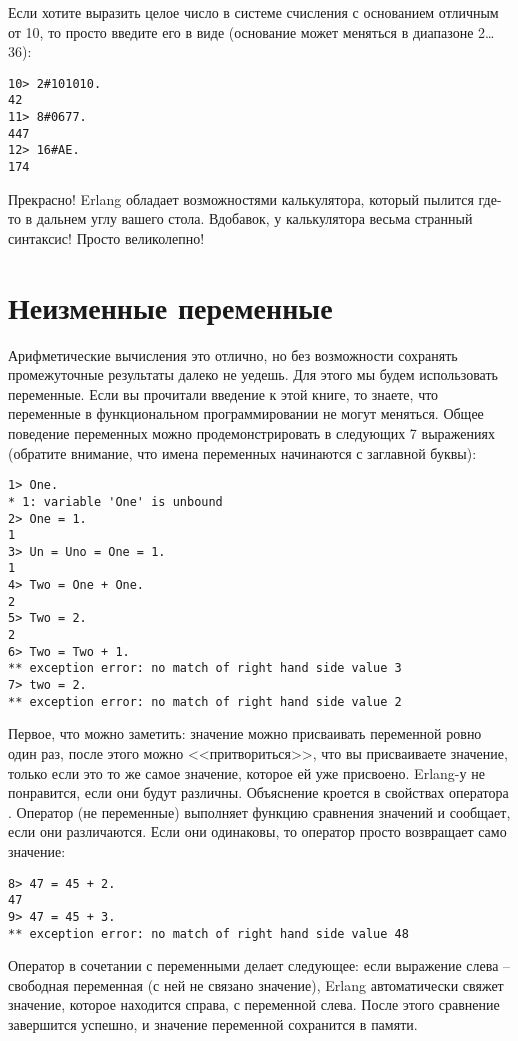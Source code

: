 Если хотите выразить целое число в системе счисления с основанием отличным от 10, то просто введите его в виде  (основание может меняться в диапазоне 2\ldots36):
\begin{lstlisting}[style=repl]
10> 2#101010.
42
11> 8#0677.
447
12> 16#AE.
174
\end{lstlisting}

Прекрасно!
Erlang обладает возможностями калькулятора, который пылится где\--то в дальнем углу вашего стола.
Вдобавок, у калькулятора весьма странный синтаксис!
Просто великолепно!
\section{Неизменные переменные}
\label{invariable-variables}
Арифметические вычисления это отлично, но без возможности сохранять промежуточные результаты далеко не уедешь.
Для этого мы будем использовать переменные.
Если вы прочитали введение к этой книге, то знаете, что переменные в функциональном программировании не могут меняться.
Общее поведение переменных можно продемонстрировать в следующих 7 выражениях (обратите внимание, что имена переменных начинаются с заглавной буквы):
\begin{lstlisting}[style=repl]
1> One.
* 1: variable 'One' is unbound
2> One = 1.
1
3> Un = Uno = One = 1.
1
4> Two = One + One.
2
5> Two = 2.
2
6> Two = Two + 1.
** exception error: no match of right hand side value 3
7> two = 2.
** exception error: no match of right hand side value 2
\end{lstlisting}

Первое, что можно заметить: значение можно присваивать переменной ровно один раз, после этого можно <<притвориться>>, что вы присваиваете значение, только если это то же самое значение, которое ей уже присвоено.
Erlang\--у не понравится, если они будут различны.
Объяснение кроется в свойствах оператора \ops{\strut=}.
Оператор \ops{\strut=} (не переменные) выполняет функцию сравнения значений и сообщает, если они различаются.
Если они одинаковы, то оператор просто возвращает само значение:
\begin{lstlisting}[style=repl]
8> 47 = 45 + 2.
47
9> 47 = 45 + 3.
** exception error: no match of right hand side value 48
\end{lstlisting}

Оператор в сочетании с переменными делает следующее: если выражение слева \--- свободная переменная (с ней не связано значение), Erlang автоматически свяжет значение, которое находится справа, с переменной слева.
После этого сравнение завершится успешно, и значение переменной сохранится в памяти.

